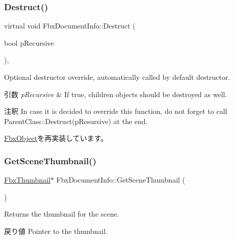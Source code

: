\subsubsection{\texorpdfstring{Destruct()}{Destruct()}}
{\footnotesize\ttfamily virtual void Fbx\+Document\+Info\+::\+Destruct (\begin{DoxyParamCaption}\item[{bool}]{p\+Recursive }\end{DoxyParamCaption})\hspace{0.3cm}{\ttfamily [protected]}, {\ttfamily [virtual]}}

Optional destructor override, automatically called by default destructor. 
\begin{DoxyParams}{引数}
{\em p\+Recursive} & If true, children objects should be destroyed as well. \\
\hline
\end{DoxyParams}
\begin{DoxyRemark}{注釈}
In case it is decided to override this function, do not forget to call Parent\+Class\+::\+Destruct(p\+Resursive) at the end. 
\end{DoxyRemark}


\hyperlink{class_fbx_object_a123e084d9b32b29c28af6384b7c3c608}{Fbx\+Object}を再実装しています。

\mbox{\label{class_fbx_document_info_a07a315ce1aaf25dd72035edc0f548d70}} 
\subsubsection{\texorpdfstring{Get\+Scene\+Thumbnail()}{GetSceneThumbnail()}}
{\footnotesize\ttfamily \hyperlink{class_fbx_thumbnail}{Fbx\+Thumbnail}$\ast$ Fbx\+Document\+Info\+::\+Get\+Scene\+Thumbnail (\begin{DoxyParamCaption}{ }\end{DoxyParamCaption})}

Returns the thumbnail for the scene. \begin{DoxyReturn}{戻り値}
Pointer to the thumbnail. 
\end{DoxyReturn}
\mbox{\label{class_fbx_document_info_ab9498e580c68b5ec5aa38bfe4c4f6123}} 
